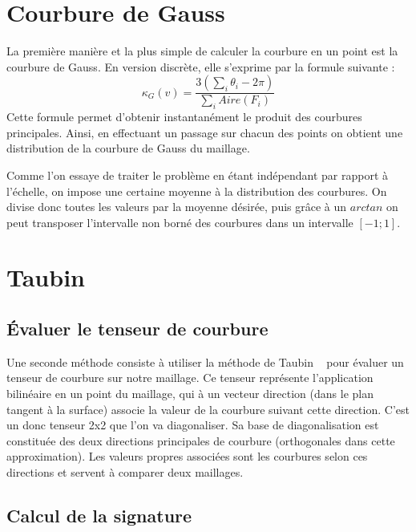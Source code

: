 \documentclass{llncs}
\begin{document}
\section{Courbure de Gauss}

La première manière et la plus simple de calculer la courbure en un point est la courbure de Gauss. En version discrète, elle s'exprime par la formule suivante :
 \[ \kappa_G(v) = \frac{3(\sum_{i}\theta_{i}-2\pi)}{\sum_{i}  Aire(F_{i})}  \]
Cette formule permet d'obtenir instantanément le produit des courbures principales. Ainsi, en effectuant un passage sur chacun des points on obtient une distribution de la courbure de Gauss du maillage. 

Comme l'on essaye de traiter le problème en étant indépendant par rapport à l'échelle, on impose une certaine moyenne à la distribution des courbures. On divise donc toutes les valeurs par la moyenne désirée, puis grâce à un $ arctan $ on peut transposer l'intervalle non borné des courbures dans un intervalle $ \left[ -1 ; 1 \right] $.


\section{Taubin}


\subsection{\'Evaluer le tenseur de courbure}
 Une seconde méthode consiste à utiliser la méthode de Taubin ~\cite{taubin} pour évaluer un tenseur de courbure sur notre maillage. Ce tenseur représente l'application bilinéaire en un point du maillage, qui à un vecteur direction (dans le plan tangent à la surface) associe la valeur de la courbure suivant cette direction. C'est un donc tenseur 2x2 que l'on va diagonaliser.
 Sa base de diagonalisation est constituée des deux directions principales de courbure (orthogonales dans cette approximation). Les valeurs propres associées sont les courbures selon ces directions et servent à comparer deux maillages.


\subsection{Calcul de la signature}
\end{document}
